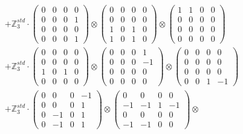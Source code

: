 \documentclass{article}
\begin{document}
{\begin{align}
        &+ \label{Rs1-Rc16-Solution-6-c12} \mathbb{Z}_3^{std} \cdot 
            \begin{pmatrix} 0 & 0 & 0 & 0 \\ 0 & 0 & 0 & 1 \\ 0 & 0 & 0 & 0 \\ 0 & 0 & 0 & 1 \end{pmatrix} \otimes 
            \begin{pmatrix} 0 & 0 & 0 & 0 \\ 0 & 0 & 0 & 0 \\ 1 & 0 & 1 & 0 \\ 1 & 0 & 1 & 0 \end{pmatrix} \otimes 
            \begin{pmatrix} 1 & 1 & 0 & 0 \\ 0 & 0 & 0 & 0 \\ 0 & 0 & 0 & 0 \\ 0 & 0 & 0 & 0 \end{pmatrix} \\ 
        &+ \label{Rs1-Rc16-Solution-6-c13} \mathbb{Z}_3^{std} \cdot 
            \begin{pmatrix} 0 & 0 & 0 & 0 \\ 0 & 0 & 0 & 0 \\ 1 & 0 & 1 & 0 \\ 0 & 0 & 0 & 0 \end{pmatrix} \otimes 
            \begin{pmatrix} 0 & 0 & 0 & 1 \\ 0 & 0 & 0 & -1 \\ 0 & 0 & 0 & 0 \\ 0 & 0 & 0 & 0 \end{pmatrix} \otimes 
            \begin{pmatrix} 0 & 0 & 0 & 0 \\ 0 & 0 & 0 & 0 \\ 0 & 0 & 0 & 0 \\ 0 & 0 & 1 & -1 \end{pmatrix} \\ 
        &+ \label{Rs1-Rc16-Solution-6-c14} \mathbb{Z}_3^{std} \cdot 
            \begin{pmatrix} 0 & 0 & 0 & -1 \\ 0 & 0 & 0 & 1 \\ 0 & -1 & 0 & 1 \\ 0 & -1 & 0 & 1 \end{pmatrix} \otimes 
            \begin{pmatrix} 0 & 0 & 0 & 0 \\ -1 & -1 & 1 & -1 \\ 0 & 0 & 0 & 0 \\ -1 & -1 & 0 & 0 \end{pmatrix} \otimes 

\end{align}}
\end{document}
